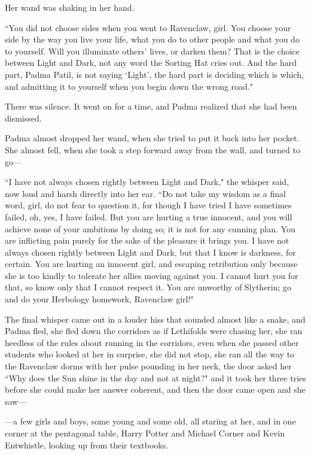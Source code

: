 Her wand was shaking in her hand.

``You did not choose sides when you went to Ravenclaw, girl. You choose your side by the way you live your life, what you do to other people and what you do to yourself. Will you illuminate others' lives, or darken them? That is the choice between Light and Dark, not any word the Sorting Hat cries out. And the hard part, Padma Patil, is not saying `Light', the hard part is deciding which is which, and admitting it to yourself when you begin down the wrong road."

There was silence. It went on for a time, and Padma realized that she had been dismissed.

Padma almost dropped her wand, when she tried to put it back into her pocket. She almost fell, when she took a step forward away from the wall, and turned to go—

``I have not always chosen rightly between Light and Dark," the whisper said, now loud and harsh directly into her ear. ``Do not take my wisdom as a final word, girl, do not fear to question it, for though I have tried I have sometimes failed, oh, yes, I have failed. But you are hurting a true innocent, and you will achieve none of your ambitions by doing so; it is not for any cunning plan. You are inflicting pain purely for the sake of the pleasure it brings you. I have not always chosen rightly between Light and Dark, but that I know is darkness, for certain. You are hurting an innocent girl, and escaping retribution only because she is too kindly to tolerate her allies moving against you. I cannot hurt you for that, so know only that I cannot respect it. You are unworthy of Slytherin; go and do your Herbology homework, Ravenclaw girl!"

The final whisper came out in a louder hiss that sounded almost like a snake, and Padma fled, she fled down the corridors as if Lethifolds were chasing her, she ran heedless of the rules about running in the corridors, even when she passed other students who looked at her in surprise, she did not stop, she ran all the way to the Ravenclaw dorms with her pulse pounding in her neck, the door asked her ``Why does the Sun shine in the day and not at night?" and it took her three tries before she could make her answer coherent, and then the door came open and she saw—

—a few girls and boys, some young and some old, all staring at her, and in one corner at the pentagonal table, Harry Potter and Michael Corner and Kevin Entwhistle, looking up from their textbooks.


